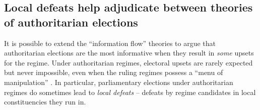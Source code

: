 \documentclass[12pt]{article}\usepackage[]{graphicx}\usepackage[]{color}
\newcommand{\1}{\mathbbm{1}}
\begin{document}

\subsection{Local defeats help adjudicate between theories of authoritarian elections}
\label{sec:local_defeat}

It is possible to extend the ``information flow'' theories to argue that authoritarian elections are the most informative when they result in \textit{some} upsets for the regime. Under authoritarian regimes, electoral upsets are rarely expected but never impossible, even when the ruling regimes possess a ``menu of manipulation'' \citep{Schedler2002menu}. In particular, parliamentary elections under authoritarian regimes do sometimes lead to \textit{local defeats} -- defeats by regime candidates in local constituencies they run in. 
\end{document}
